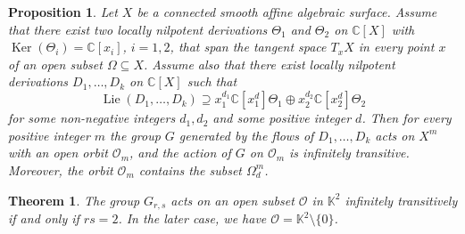 \documentclass[10pt,a4paper]{amsart}
\newtheorem{theorem}{Theorem}
\newtheorem{proposition}{Proposition}
\def\CC{{\mathbb C}}
\def\KK{{\mathbb K}}
\DeclareMathOperator{\Ker}{Ker}
\def\OOO{\mathcal{O}}
\DeclareMathOperator{\lie}{Lie}
\begin{document}
\begin{proposition} \label{pimp}
Let $X$ be a connected smooth affine algebraic surface. Assume that there exist two locally nilpotent derivations $\Theta_1$ and $\Theta_2$ on $\CC[X]$ with $\Ker(\Theta_i)=\CC[x_i]$, 
$i=1,2$, that span the tangent space $T_xX$ in every point $x$ of an open subset $\Omega\subseteq X$. Assume also that there exist locally nilpotent derivations $D_1,\ldots,D_k$ on
$\CC[X]$ such that 
$$
\lie(D_1,\ldots,D_k)\supseteq x_1^{d_1}\CC[x_1^d]\Theta_1\oplus x_2^{d_2}\CC[x_2^d]\Theta_2
$$
for some non-negative integers $d_1,d_2$ and some positive integer $d$. 
Then for every positive integer $m$ the group $G$ generated by the flows of  $D_1,\ldots,D_k$ acts on $X^m$ with an open orbit $\OOO_m$, and the action of $G$ on $\OOO_m$ is infinitely transitive. Moreover, the orbit $\OOO_m$  contains the subset $\Omega^m_d$. 
\end{proposition}

\begin{theorem} \label{teor2}
The group $G_{r,s}$ acts on an open subset $\OOO$ in $\KK^2$ infinitely transitively if and only if $rs=2$. In the later case, we have $\OOO=\KK^2\setminus\{0\}$. 
\end{theorem}
\end{document}

